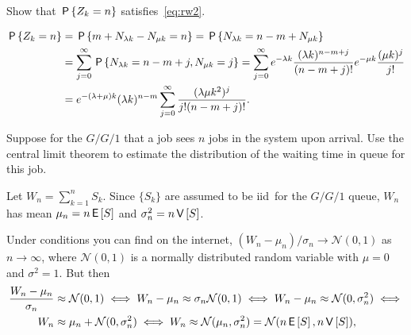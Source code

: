 \begin{exercise}\label{ex:l-134}
 Show that $\P{Z_k=n}$ satisfies~\cref{eq:rw2}.
\begin{solution}
\begin{align*}
 \P{Z_k=n}
&= \P{m+N_{\lambda k } - N_{\mu k} = n }
= \P{N_{\lambda k} = n - m + N_{\mu k}} \\
&= \sum_{j=0}^\infty \P{N_{\lambda k}  =  n - m + j, N_{\mu k} =j}
= \sum_{j=0}^\infty e^{-\lambda k} \frac{(\lambda k )^{n - m + j}}{(n-m+j)!} e^{-\mu k} \frac{(\mu k )^j}{j!} \\
&= e^{-(\lambda+\mu)k} (\lambda k)^{n-m} \sum_{j=0}^\infty  \frac{(\lambda\mu k^2)^j} {j!(n-m+j)!}.
\end{align*}
\end{solution}
\end{exercise}




\begin{exercise}\label{ex:l-147}
 Suppose
 for the $G/G/1$ that a job sees $n$ jobs in the system upon arrival.
 Use the central limit theorem to estimate the distribution of the waiting time in queue for this job.
\begin{hint}
 Let $W_{n} = \sum_{k=1}^n S_k$.
 Since $\{S_k\}$ are assumed to be iid\ for the $G/G/1$ queue, $W_{n}$ has mean $\mu_n = n \E S$ and $\sigma_n^2 = n\V S$.
\end{hint}
\begin{solution} Under conditions you can find on the internet, $(W_{n} - \mu_n)/\sigma_n \to \mathcal{N}(0,1)$ as $n\to \infty$,
 where $\mathcal{N}(0,1)$ is a normally distributed random variable
 with $\mu=0$ and $\sigma^2=1$. But then
 \begin{align*}
 \frac{\W_{n} - \mu_n}{\sigma_n} &\approx \mathcal{N}(0,1) \iff  W_{n} - \mu_n \approx \sigma_n \mathcal{N}(0,1) \iff
 W_{n} - \mu_n \approx \mathcal{N}(0,\sigma_n^2) \iff \\
 W_{n} &\approx \mu_n + \mathcal{N}(0,\sigma_n^2) \iff
 W_{n} \approx \mathcal{N}(\mu_n,\sigma_n^2) = \mathcal{N}(n\E S, n \V S),
 \end{align*}
\end{solution}
\end{exercise}




